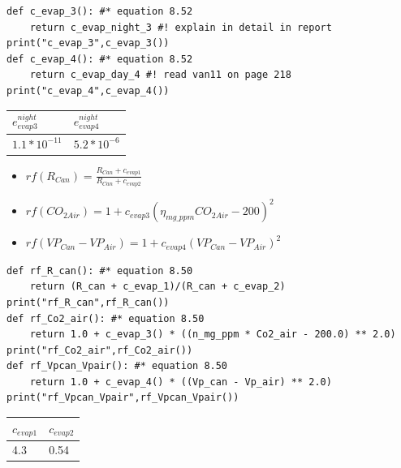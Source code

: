 \documentclass[a4paper]{article}
\numberwithin{equation}{section}
\begin{document}
\begin{mdframed}[leftline=false,rightline=false,backgroundcolor=cyan!10]
  \begin{verbatim}
def c_evap_3(): #* equation 8.52
    return c_evap_night_3 #! explain in detail in report
print("c_evap_3",c_evap_3())
def c_evap_4(): #* equation 8.52
    return c_evap_day_4 #! read van11 on page 218
print("c_evap_4",c_evap_4())
\end{verbatim}
\end{mdframed}
\begin{table}[H]
\centering
\begin{tabular}{|l|l|}
\hline
\rowcolor[HTML]{FFFC9E} 
\textbf{$e^{night}_{evap3}$} & \textbf{$e^{night}_{evap4}$}  \\ \hline
$1.1*10^{-11}$           & $5.2*10^{-6}$                                 \\ \hline
\end{tabular}
\end{table}
\begin{itemize}
    \item $ rf(R_{Can}) = \frac{R_{Can} + c_{evap1}}{R_{Can} + c_{evap2}} $ \\
    \item $ rf(CO_{2Air}) = 1 + {c_{evap3} (\eta_{mg\_ppm} CO_{2Air} - 200)}^2$  \\
    \item $ rf(VP_{Can} - VP_{Air}) = 1 + {c_{evap4} (VP_{Can} - VP_{Air})}^2 $ \\
\end{itemize}

\begin{mdframed}[leftline=false,rightline=false,backgroundcolor=cyan!10]
  \begin{verbatim}
def rf_R_can(): #* equation 8.50
    return (R_can + c_evap_1)/(R_can + c_evap_2)
print("rf_R_can",rf_R_can())
def rf_Co2_air(): #* equation 8.50
    return 1.0 + c_evap_3() * ((n_mg_ppm * Co2_air - 200.0) ** 2.0)
print("rf_Co2_air",rf_Co2_air())
def rf_Vpcan_Vpair(): #* equation 8.50
    return 1.0 + c_evap_4() * ((Vp_can - Vp_air) ** 2.0)
print("rf_Vpcan_Vpair",rf_Vpcan_Vpair())
\end{verbatim}
\end{mdframed}

\begin{table}[H]
\centering
\begin{tabular}{|l|l|}
\hline
\rowcolor[HTML]{FFFC9E} 
\textbf{$c_{evap1}$} & \textbf{$c_{evap2}$}  \\ \hline
  4.3        &    0.54                             \\ \hline
\end{tabular}
\end{table}
\end{document}

